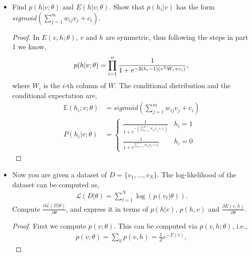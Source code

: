 \documentclass[12pt]{article}
\newcommand{\E}{\mathbb{E}}
\newcommand{\1}{\mathbf{1}}
\begin{document}
{\begin{itemize}
\begin{proof}
\begin{align*}
  \end{align*}
  The conditional expectation is thus given as,
  \begin{align*}
    \E(v | h; \theta) = \left(E(v_1|h; \theta) ,..., \E(v_n | h; \theta ) \right), 
  \end{align*}
  where $\E(v_j|h; \theta)$ is given as,
  \begin{align*}
    \E(v_j|h; \theta) = p(v_j=1|h; \theta) = sigmoid\left(\sum_{i=1}^n w_{ij}h_i + b_j\right).
  \end{align*}
  \end{proof}
  \item Find $p(h|v; \theta)$ and $E(h|v; \theta)$. Show that $p(h_i|v)$ has the form $sigmoid(\sum_{j=1}^m w_{ij} v_j + c_i)$.
  \begin{proof}
    In $E(v, h; \theta)$, $v$ and $h$ are symmetric, thus following the steps in part 1 we know,
    \begin{align*}
      p(h | v; \theta) = \prod_{i=1}^n \frac{1}{1 + e^{-2(h_i - 1)(v^{\rm T} W_i + c_i)}},
    \end{align*}
    where $W_i$ is the $i$-th column of $W$. The conditional distribution and the conditional expectation are,
    \begin{align*} 
      \E(h_i; v; \theta) &= sigmoid\left(\sum_{j=1}^m w_{ij} v_j + c_i\right) \\
      P(h_i | v; \theta) &= \left\{\begin{array}{ll}\frac{1}{1 + e^{-(\sum_{j=1}^m w_{ij} v_j + c_i) }} & h_i = 1 \\ \frac{1}{1 + e^{\sum_{j=1}^m w_{ij} v_j + c_i}} & h_i = 0 \end{array}\right.
    \end{align*}
  \end{proof}
  \item Now you are given a dataset of $D = \{v_1,...,v_N\}$. The log-likelihood of the dataset can be computed as,
  \begin{align*}
    \mathcal{L}(D | \theta) = \sum_{t=1}^N \log (p(v_t | \theta)).
  \end{align*}
  Compute $\frac{\partial \mathcal{L}(D|\theta)}{\partial \theta}$, and express it in terms of $p(h|v)$, $p(h, v)$ and $\frac{\partial E(v,h)}{\partial \theta}$.
  \begin{proof}
    First we compute $p(v; \theta)$. This can be computed via $p(v, h; \theta)$, i.e.,
    \begin{align*}
      p(v;\theta) = \sum_{h} p(v, h) = \frac{1}{Z} e^{-F(v)},

\end{align*}
\end{proof}
\end{itemize}}
\end{document}
